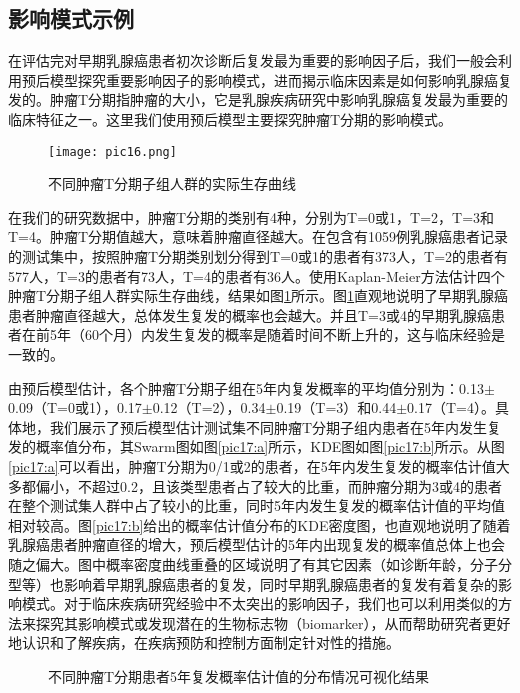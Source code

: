\subsection{影响模式示例}

在评估完对早期乳腺癌患者初次诊断后复发最为重要的影响因子后，我们一般会利用预后模型探究重要影响因子的影响模式，进而揭示临床因素是如何影响乳腺癌复发的。肿瘤T分期指肿瘤的大小，它是乳腺疾病研究中影响乳腺癌复发最为重要的临床特征之一。这里我们使用预后模型主要探究肿瘤T分期的影响模式。

\begin{figure}[H]
\texttt{[image: pic16.png]}
\caption{不同肿瘤T分期子组人群的实际生存曲线}
\label{pic16}
\end{figure}

在我们的研究数据中，肿瘤T分期的类别有4种，分别为T=0或1，T=2，T=3和T=4。肿瘤T分期值越大，意味着肿瘤直径越大。在包含有1059例乳腺癌患者记录的测试集中，按照肿瘤T分期类别划分得到T=0或1的患者有373人，T=2的患者有577人，T=3的患者有73人，T=4的患者有36人。使用Kaplan-Meier方法估计四个肿瘤T分期子组人群实际生存曲线，结果如图\ref{pic16}所示。图\ref{pic16}直观地说明了早期乳腺癌患者肿瘤直径越大，总体发生复发的概率也会越大。并且T=3或4的早期乳腺癌患者在前5年（60个月）内发生复发的概率是随着时间不断上升的，这与临床经验是一致的。

由预后模型估计，各个肿瘤T分期子组在5年内复发概率的平均值分别为：0.13$\pm$0.09（T=0或1），0.17$\pm$0.12（T=2），0.34$\pm$0.19（T=3）和0.44$\pm$0.17（T=4）。具体地，我们展示了预后模型估计测试集不同肿瘤T分期子组内患者在5年内发生复发的概率值分布，其Swarm图如图\ref{pic17:a}所示，KDE图如图\ref{pic17:b}所示。从图\ref{pic17:a}可以看出，肿瘤T分期为0/1或2的患者，在5年内发生复发的概率估计值大多都偏小，不超过0.2，且该类型患者占了较大的比重，而肿瘤分期为3或4的患者在整个测试集人群中占了较小的比重，同时5年内发生复发的概率估计值的平均值相对较高。图\ref{pic17:b}给出的概率估计值分布的KDE密度图，也直观地说明了随着乳腺癌患者肿瘤直径的增大，预后模型估计的5年内出现复发的概率值总体上也会随之偏大。图中概率密度曲线重叠的区域说明了有其它因素（如诊断年龄，分子分型等）也影响着早期乳腺癌患者的复发，同时早期乳腺癌患者的复发有着复杂的影响模式。对于临床疾病研究经验中不太突出的影响因子，我们也可以利用类似的方法来探究其影响模式或发现潜在的生物标志物（biomarker），从而帮助研究者更好地认识和了解疾病，在疾病预防和控制方面制定针对性的措施。

\begin{figure}[h]
\centering 
{}
\hspace{0.01\linewidth}
\caption{不同肿瘤T分期患者5年复发概率估计值的分布情况可视化结果}
\label{pic17}
\end{figure}

